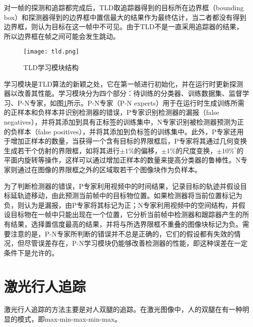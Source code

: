   对一帧的探测和追踪都完成后，TLD取追踪器得到的目标所在边界框（bounding box）和探测器得到的边界框中置信最大的结果作为最终估计，当二者都没有得到边界框，则认为目标在这一帧中不可见。由于TLD不是一直采用追踪器的结果，所以边界框在帧之间可能会发生跳动。

\begin{figure}[htb]
  \centering
  \texttt{[image: tld.png]}
  \caption{TLD学习模块结构}
  \label{fig:tldlearning}
\end{figure}

  学习模块是TLD算法的新颖之处，它在第一帧进行初始化，并在运行时更新探测器以改善其性能。学习模块分为四个部分：待训练的分类器、训练数据集、监督学习、P-N专家，如图\ref{fig:tldlearning}所示。P-N专家（P-N experts）用于在运行时生成训练所需的正样本和负样本并识别检测器的错误，P专家识别检测器的漏报（false negatives），并将其添加到具有正标签的训练集中，N专家识别被检测器预测为正的负样本（false positives），并将其添加到负标签的训练集中。此外，P专家还用于增加正样本的数量，当获得一个含有目标的界限框后，P专家将其通过几何变换生成若干个仿射的界限框，如将其进行$\pm 1\%$的偏移，$\pm 1\%$的尺度变换，$\pm 10\%^{\circ}$的平面内旋转等操作，这样可以通过增加正样本的数量来提高分类器的鲁棒性。N专家则通过在图像的界限框之外的区域取若干个图像块作为负样本。


  为了判断检测器的错误，P专家利用视频中的时间结果，记录目标的轨迹并假设目标延轨迹移动，由此预测当前帧中的目标物位置。如果检测器将当前位置标记为负，则认为是漏报，由P专家将其标记为正；N专家利用视频中的空间结构，并假设目标物在一帧中只能出现在一个位置，它分析当前帧中检测器和跟踪器产生的所有结果，选择置信度最高的结果，并将与所选界限框不重叠的图像块标记为负。需要注意的是，P-N专家所判断的错误并不总是正确的，它们的假设都有失效的情况，但尽管误差存在，P-N学习模块仍能够改善检测器的性能，即这种误差在一定条件下是允许的。
  

\section{激光行人追踪}
激光行人追踪的方法主要是对人双腿的追踪。在激光图像中，人的双腿在有一种明显的模式，即max-min-max-min-max。
